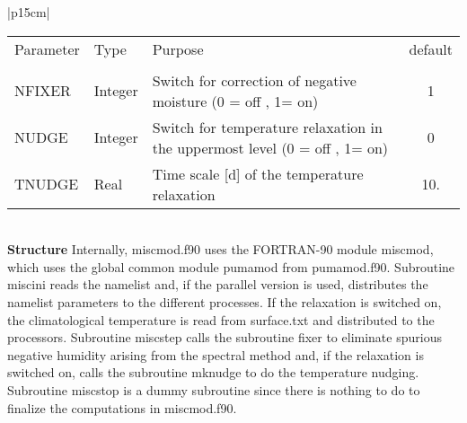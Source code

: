 \begin{center}
\begin{tabular}{|p{15cm}|}
\begin{center}
\begin{tabular}{l l p{5cm} c} %
Parameter & Type & Purpose & default \\
&&& \\
NFIXER & Integer & Switch for correction of negative moisture (0 = off , 1= on) & 1 \\
NUDGE  & Integer & Switch for temperature relaxation in the uppermost level (0 = off , 1= on)
& 0 \\
TNUDGE& Real & Time scale [d] of the temperature relaxation & 10. \\
\end{tabular} 
\end{center}
\vspace{3mm} \\
\hline
\vspace{2mm} {\bf Structure} Internally, {\module miscmod.f90} uses the FORTRAN-90
module {\modu miscmod}, which uses the global common module {\modu pumamod} from
{\module pumamod.f90}. Subroutine {\sub miscini} reads the namelist and, if the parallel
version is used,  distributes the namelist parameters to the different processes. If the relaxation
is
switched on, the climatological temperature is read from {\file surface.txt} and distributed
to the processors.   Subroutine {\sub miscstep} calls the subroutine {\sub fixer} to eliminate
spurious negative humidity arising from the spectral method and, if the relaxation is switched
on,
calls the subroutine {\sub mknudge} to do the temperature nudging. Subroutine {\sub miscstop}
is a dummy subroutine since there is nothing to do to finalize the computations in {\module
miscmod.f90}. \vspace{3mm} \\
\hline
\end{tabular}
\end{center} 
\newpage
\clearpage
